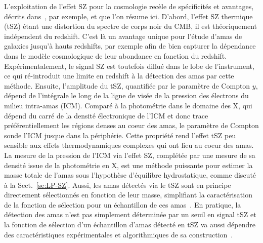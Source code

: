 L'exploitation de l'effet SZ pour la cosmologie recèle de spécificités
et avantages, décrits dans~\citet{Carlstrom2002}, par exemple, et que
l'on résume ici. D'abord, l'effet SZ thermique (tSZ)
étant une distortion du spectre de corps noir du CMB, il est
théoriquement indépendent du redshift. C'est là un avantage unique
pour l'étude d'amas de galaxies jusqu'à hauts redshifts, par exemple
afin de bien capturer la dépendance dans le modèle cosmologique de
leur abondance en fonction du redshift. Expérimentalement, le signal SZ est toutefois dillué
dans le lobe de l'instrument, ce qui ré-introduit une limite en
redshift à la détection des amas par cette méthode. Ensuite,
l'amplitude du tSZ, quantifiée par le paramètre de Compton $y$, dépend
de l'intégrale le long de la ligne de visée de la pression des
électrons du milieu intra-amas (ICM). %
Comparé à la photométrie dans le domaine des X, qui dépend du carré de
la densité électronique de l'ICM et donc trace préférentiellement les régions
denses au coeur des amas, le paramètre de Compton sonde l'ICM jusque
dans la périphérie. Cette propriété rend l'effet tSZ peu sensible aux
effets thermodynamiques complexes qui ont lieu au coeur des
amas. La mesure de la pression de l'ICM via l'effet SZ, complétée par
une mesure de sa densité issue de la photométrie en X, est une méthode
puissante pour estimer la masse totale de l'amas sous l'hypothèse
d'équilibre hydrostatique, comme discuté à la Sect.~\ref{se:LP-SZ}.
Aussi, les amas détectés via le tSZ sont en principe directement
sélectionnés en fonction de leur masse, simplifiant la caractérisation
de la fonction de sélection pour un échantillon de ces
amas~\citep{Holder2000}. En pratique, la détection des amas n'est pas
simplement déterminée par un seuil en signal tSZ et la fonction de
sélection d'un échantillon d'amas détecté en tSZ va aussi dépendre des
caractéristiques expérimentales et algorithmiques de sa
construction~\citep{Melin2005}.

